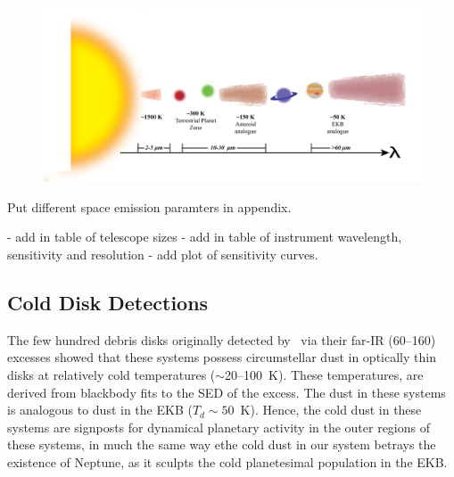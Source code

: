     \begin{figure}
    \centering
    \includegraphics[width=\textwidth]{Ch1/planet_sandwich_RPatel}
    \caption[]{}
    \label{fig:planet_sandwich}
    \end{figure}
    
    
   
   
   Put different space emission paramters in appendix.
   
   - add in table of telescope sizes
   - add in table of instrument wavelength, sensitivity and resolution
   - add plot of sensitivity curves.
   
   
   
   \subsection{Cold Disk Detections}
   
   
    The few hundred debris disks originally detected by \iras\ via their far-IR (60--160\micron) excesses showed that these systems possess circumstellar dust in optically thin disks at relatively cold temperatures ($\sim$20--100~K). These temperatures, are derived from blackbody fits to the SED of the excess. The dust in these systems is analogous to dust in the EKB ($T_d\sim50$~K). Hence, the cold dust in these systems are signposts for dynamical planetary activity in the outer regions of these systems, in much the same way ethe cold dust in our system betrays the existence of Neptune, as it sculpts the cold planetesimal population in the EKB. 
   
